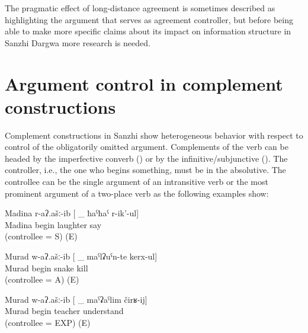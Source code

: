 The pragmatic effect of long-distance agreement is sometimes described as highlighting the argument that serves as agreement controller, but before being able to make more specific claims about its impact on information structure in Sanzhi Dargwa more research is needed. 



\section{Argument control in complement constructions}
\label{sec:Argument control in complement constructions}

Complement constructions in Sanzhi show heterogeneous behavior with respect to control of the obligatorily omitted argument. Complements of the verb   can be headed by the imperfective converb () or by the infinitive\slash subjunctive (). The controller, i.e., the one who begins something, must be in the absolutive. The controllee can be the single argument of an intransitive verb or the most prominent argument of a two-place verb as the following examples show:
%
\begin{exe}
	\ex	\label{ex:Madina, Murad, snakes, teacher@42}
	\begin{xlist}
		\ex	\label{ex:Madina began to laugh@42a}
		\gll	Madina	r-aʔ.ašː-ib	[ \_	ħaˁħaˁ	r-ik'-ul]\\
			Madina	begin	{} 		laughter	say\\
		\glt	{} (controllee = S) (E)

		\ex	\label{ex:Murad began to kill snakes@42b}
		\gll	Murad	w-aʔ.ašː-ib	[ \_	maˁlʡuˁn-te	kerx-ul]\\
			Murad	begin	{} 	snake	kill\\
		\glt	{} (controllee = A) (E)

		\ex	\label{ex:Murad began to understand the teacher@42c}
		\gll	Murad	w-aʔ.ašː-ib	[ \_	maˁʡaˁlim	čirʁ-ij]\\
			Murad	begin	{} 	teacher	understand\\
		\glt	{} (controllee = EXP) (E)
	\end{xlist}
\end{exe}

